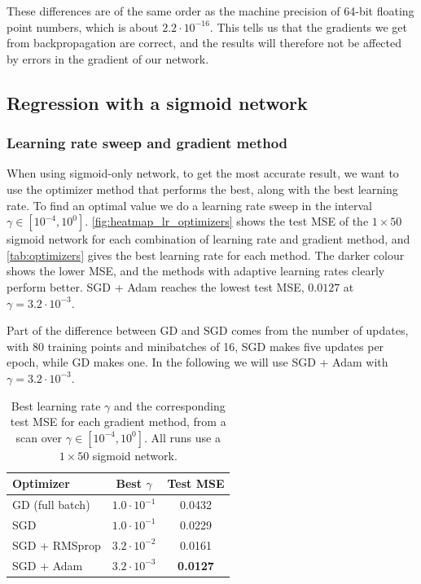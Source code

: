 \documentclass[reprint,english,notitlepage, floatfix]{revtex4-2}  %
\begin{document}
These differences are of the same order as the machine precision of 64-bit floating point numbers, which is about $2.2 \cdot 10^{-16}$. This tells us that the gradients we get from backpropagation are correct, and the results will therefore not be affected by errors in the gradient of our network. 

\subsection{Regression with a sigmoid network}\label{sec:res_b} %

\subsubsection{Learning rate sweep and gradient method}\label{sec:learning rate sweep}

When using sigmoid-only network, to get the most accurate result, we want to use the optimizer method that performs the best, along with the best learning rate. To find an optimal value we do a learning rate sweep in the interval $\gamma \in [10^{-4}, 10^{0}]$. \autoref{fig:heatmap_lr_optimizers} shows the test MSE of the $1 \times 50$ sigmoid network for each combination of learning rate and gradient method, and \autoref{tab:optimizers} gives the best learning rate for each method.  The darker colour shows the lower MSE, and the methods with adaptive learning rates clearly perform better. SGD + Adam reaches the lowest test MSE, $0.0127$ at $\gamma = 3.2 \cdot 10^{-3}$. 

Part of the difference between GD and SGD comes from the number of updates, with 80 training points and minibatches of 16, SGD makes five updates per epoch, while GD makes one. In the following we will use SGD + Adam with $\gamma = 3.2 \cdot 10^{-3}$.

\begin{table}[htbp]
    \centering
    \caption{Best learning rate $\gamma$ and the corresponding test MSE for each gradient method,
    from a scan over $\gamma \in [10^{-4}, 10^{0}]$. All runs use a
    $1 \times 50$ sigmoid network.}
    \label{tab:optimizers}
    \begin{tabular}{lcc}
        \toprule
        Optimizer & Best $\gamma$ & Test MSE \\
        \midrule
        GD (full batch)  & $1.0 \cdot 10^{-1}$ & 0.0432 \\
        SGD              & $1.0 \cdot 10^{-1}$ & 0.0229 \\
        SGD + RMSprop    & $3.2 \cdot 10^{-2}$ & 0.0161 \\
        SGD + Adam       & $3.2 \cdot 10^{-3}$ & \textbf{0.0127} \\
        \bottomrule
    \end{tabular}
\end{table}
\end{document}
